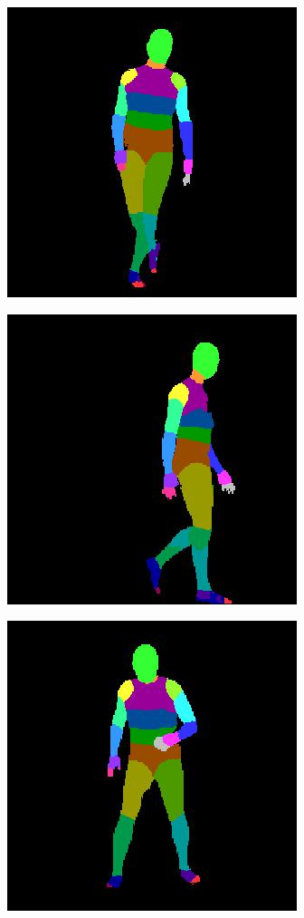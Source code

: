 \documentclass{beamer}
\begin{document}
\begin{frame}
\begin{figure}
\centering
\begin{subfigure}{.32\textwidth}
\centering
  \includegraphics[scale=0.2]{ung_104_36_c0011_7.jpg}
\end{subfigure}
\begin{subfigure}{.32\textwidth}
  \centering
  \includegraphics[scale=0.2]{40_02_c0011_19.jpg}
\end{subfigure}
\begin{subfigure}{.32\textwidth}
  \centering
  \includegraphics[scale=0.2]{104_52_c0002_64.jpg}
\end{subfigure}

\label{hourglass:inference}
\end{figure}
\end{frame}
\end{document}

